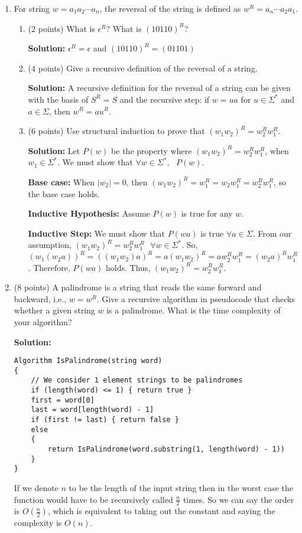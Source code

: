 \documentclass[11pt]{article}
\begin{document}
\begin{enumerate}
\item For string $w=a_1a_2\cdots a_n$, the reversal of the string is defined as
$w^R=a_n\cdots a_2a_1$.
\begin{enumerate}
\item (2 points) What is $\epsilon^R$? What is $(10110)^R$?

\textbf{Solution: }
$\epsilon^R = \epsilon$ and $(10110)^R = (01101)$

\item (4 points) Give a recursive definition of the reversal of a string.

\textbf{Solution: }
A recursive definition for the reversal of a string can be given with the basis of $S^R = S$ and the recursive step: if $w = ua$ for $u \in \Sigma^*$ and $a \in \Sigma$, then $w^R = au^R$.  

\item (6 points) Use structural induction to prove that $(w_1w_2)^R=w_2^Rw_1^R$.

\textbf{Solution: }
Let $P(w)$ be the property where $(w_1w_2)^R=w_2^Rw_1^R$, when $w_1 \in \Sigma^*$.  
We must show that $\forall w \in \Sigma^*, \text{ } P(w)$.  

\textbf{Base case: } When $|w_2| = 0$, then $(w_1w_2)^R = w_1^R = w_2w_1^R = w_2^Rw_1^R$, so the base case holds.  

\textbf{Inductive Hypothesis: } Assume $P(w)$ is true for any $w$.  

\textbf{Inductive Step: } We must show that $P(wa)$ is true $\forall a \in \Sigma$.  From our assumption, $(w_1w_2)^R = w_2^Rw_1^R \text{ } \forall w \in \Sigma^*$.  So, $(w_1(w_2a))^R = ((w_1w_2)a)^R = a(w_1w_2)^R = aw_2^Rw_1^R = (w_2a)^Rw_1^R$.  Therefore, $P(wa)$ holds.  Thus, $(w_1w_2)^R = w_2^Rw_1^R$.  


\end{enumerate}

\item (8 points) 
A palindrome is a string that reads the same forward and backward, i.e., $w=w^R$.
Give a recursive algorithm in pseudocode that checks whether a given string $w$ is a palindrome.
What is the time complexity of your algorithm?

\textbf{Solution: }
\begin{verbatim}
Algorithm IsPalindrome(string word)
{
    // We consider 1 element strings to be palindromes
    if (length(word) <= 1) { return true }
    first = word[0]
    last = word[length(word) - 1]
    if (first != last) { return false }
    else
    {
        return IsPalindrome(word.substring(1, length(word) - 1))
    }
}
\end{verbatim}
If we denote $n$ to be the length of the input string then in the worst case the function would have to be recursively called $\frac{n}{2}$ times.  So we can say the order is $O(\frac{n}{2})$, which is equivalent to taking out the constant and saying the complexity is $O(n)$.  


\end{enumerate}
\end{document}
